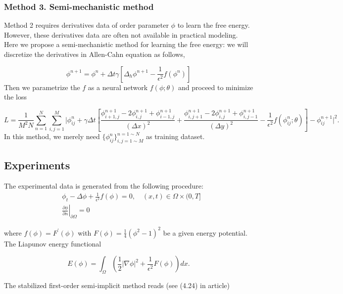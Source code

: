 \subsubsection{Method 3. Semi-mechanistic method}
Method 2 requires derivatives data of order parameter $\phi$ to learn the free energy. However, these derivatives data are often not available in practical modeling. Here we propose a semi-mechanistic method for learning the free energy: we will discretize the derivatives in Allen-Cahn equation as follows,

\begin{equation}
    \phi^{n+1} = \phi^{n} + \Delta t \gamma [ \Delta_{h} \phi^{n+1} - \frac{1}{\epsilon^2} f( \phi^{n} ) ]
\end{equation}
Then we parametrize the $f$ as a neural network $f( \phi; \theta )$ and proceed to minimize the loss

\begin{equation}
    L = \frac{1}{M^{2}N} \sum^{N}_{n=1} \sum^{M}_{i,j=1} \lvert \phi^{n}_{ij} + \gamma \Delta t [\frac{\phi^{n+1}_{i+1,j} - 2 \phi^{n+1}_{i,j} + \phi^{n+1}_{i-1,j}}{(\Delta x)^2} + \frac{\phi^{n+1}_{i,j+1} - 2 \phi^{n+1}_{i,j} + \phi^{n+1}_{i,j-1}}{(\Delta y)^2} - \frac{1}{\epsilon^2} f( \phi^{n}_{ij}; \theta ) ] - \phi^{n+1}_{ij} \rvert^{2}.
\end{equation}
In this method, we merely need $\{ \phi^{n}_{ij} \}^{n=1 \sim N}_{i,j=1 \sim M}$ as training dataset.



\subsection{Experiments}
The experimental data is generated from the following procedure:
$$
\begin{aligned}
& \phi_t-\Delta \phi+\frac{1}{\epsilon^2} f(\phi)=0, \quad(x, t) \in \Omega \times(0, T] \\
& \left.\frac{\partial \phi}{\partial n}\right|_{\partial \Omega}=0
\end{aligned}
$$

where $f(\phi)=F^{\prime}(\phi)$ with $F(\phi)=\frac{1}{4}\left(\phi^2-1\right)^2$ be a given energy potential. The Liapunov energy functional

$$
E(\phi)=\int_{\Omega}\left(\frac{1}{2}|\nabla \phi|^2+\frac{1}{\epsilon^2} F(\phi)\right) d x .
$$


The stabilized first-order semi-implicit method reads (see (4.24) in article)

